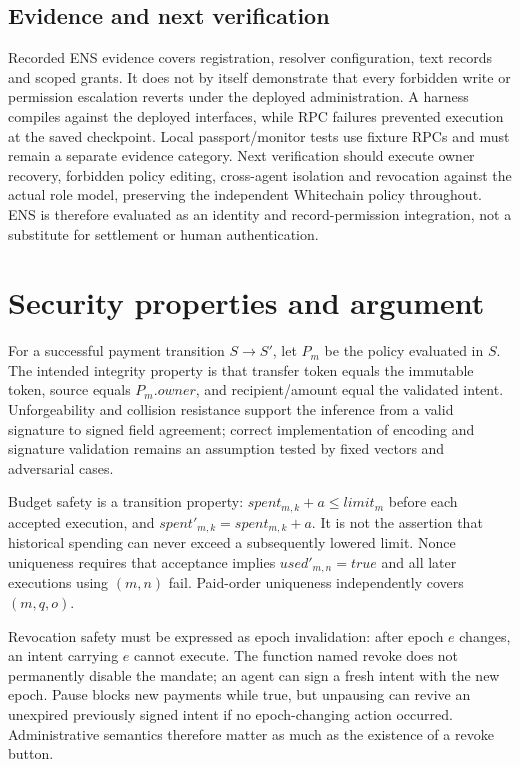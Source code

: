 \documentclass[11pt]{article}
\begin{document}
\subsection{Evidence and next verification}
Recorded ENS evidence covers registration, resolver configuration, text records and scoped grants. It does not by itself demonstrate that every forbidden write or permission escalation reverts under the deployed administration. A harness compiles against the deployed interfaces, while RPC failures prevented execution at the saved checkpoint. Local passport/monitor tests use fixture RPCs and must remain a separate evidence category. Next verification should execute owner recovery, forbidden policy editing, cross-agent isolation and revocation against the actual role model, preserving the independent Whitechain policy throughout. ENS is therefore evaluated as an identity and record-permission integration, not a substitute for settlement or human authentication.



\section{Security properties and argument}
For a successful payment transition $S\rightarrow S'$, let $P_m$ be the policy evaluated in $S$. The intended integrity property is that transfer token equals the immutable token, source equals $P_m.owner$, and recipient/amount equal the validated intent. Unforgeability and collision resistance support the inference from a valid signature to signed field agreement; correct implementation of encoding and signature validation remains an assumption tested by fixed vectors and adversarial cases.

Budget safety is a transition property: $spent_{m,k}+a\leq limit_m$ before each accepted execution, and $spent'_{m,k}=spent_{m,k}+a$. It is not the assertion that historical spending can never exceed a subsequently lowered limit. Nonce uniqueness requires that acceptance implies $used'_{m,n}=true$ and all later executions using $(m,n)$ fail. Paid-order uniqueness independently covers $(m,q,o)$.

Revocation safety must be expressed as epoch invalidation: after epoch $e$ changes, an intent carrying $e$ cannot execute. The function named revoke does not permanently disable the mandate; an agent can sign a fresh intent with the new epoch. Pause blocks new payments while true, but unpausing can revive an unexpired previously signed intent if no epoch-changing action occurred. Administrative semantics therefore matter as much as the existence of a revoke button.
\end{document}
